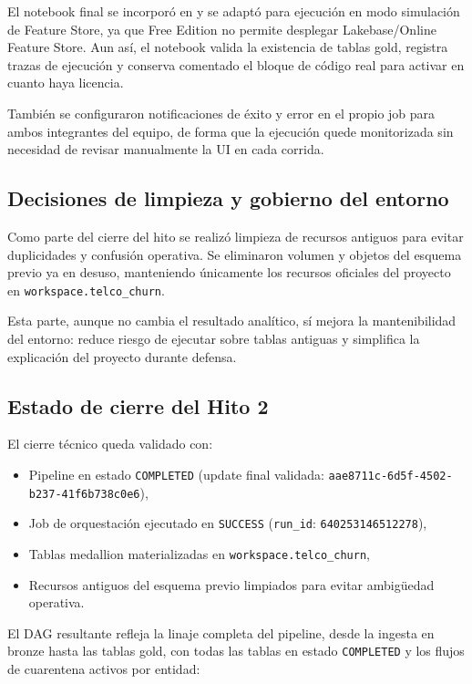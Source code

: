 \documentclass[12pt,a4paper]{article}
\begin{document}
El notebook final se incorporó en  y se adaptó para ejecución en modo simulación de Feature Store, ya que Free Edition no permite desplegar Lakebase/Online Feature Store. Aun así, el notebook valida la existencia de tablas gold, registra trazas de ejecución y conserva comentado el bloque de código real para activar en cuanto haya licencia.

También se configuraron notificaciones de éxito y error en el propio job para ambos integrantes del equipo, de forma que la ejecución quede monitorizada sin necesidad de revisar manualmente la UI en cada corrida.

\subsection{Decisiones de limpieza y gobierno del entorno}

Como parte del cierre del hito se realizó limpieza de recursos antiguos para evitar duplicidades y confusión operativa. Se eliminaron volumen y objetos del esquema previo ya en desuso, manteniendo únicamente los recursos oficiales del proyecto en \texttt{workspace.telco\_churn}.

Esta parte, aunque no cambia el resultado analítico, sí mejora la mantenibilidad del entorno: reduce riesgo de ejecutar sobre tablas antiguas y simplifica la explicación del proyecto durante defensa.

\subsection{Estado de cierre del Hito 2}

El cierre técnico queda validado con:
\begin{itemize}
    \item Pipeline en estado \texttt{COMPLETED} (update final validada: \texttt{aae8711c-6d5f-4502-b237-41f6b738c0e6}),
    \item Job de orquestación ejecutado en \texttt{SUCCESS} (\texttt{run\_id}: \texttt{640253146512278}),
    \item Tablas medallion materializadas en \texttt{workspace.telco\_churn},
    \item Recursos antiguos del esquema previo limpiados para evitar ambigüedad operativa.
\end{itemize}

El DAG resultante refleja la linaje completa del pipeline, desde la ingesta en bronze hasta las tablas gold, con todas las tablas en estado \texttt{COMPLETED} y los flujos de cuarentena activos por entidad:
\end{document}
